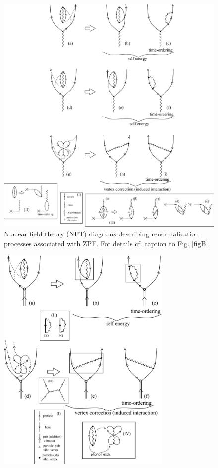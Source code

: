 \begin{subappendices}
\begin{figure}[h!]
\begin{center}
\includegraphics*[width=1.2\textwidth]{C7/figs_C7/FigA.pdf}
\end{center}
\caption{Nuclear field theory (NFT) diagrams describing renormalization processes associated with ZPF. For details cf. caption to Fig. \ref{figB}.}\label{figA}
\end{figure}
 \begin{figure}[h!]
 	\begin{center}
\includegraphics*[width=0.75\textwidth]{C7/figs_C7/FigB.pdf}

\end{center}
\end{figure}
\end{subappendices}
